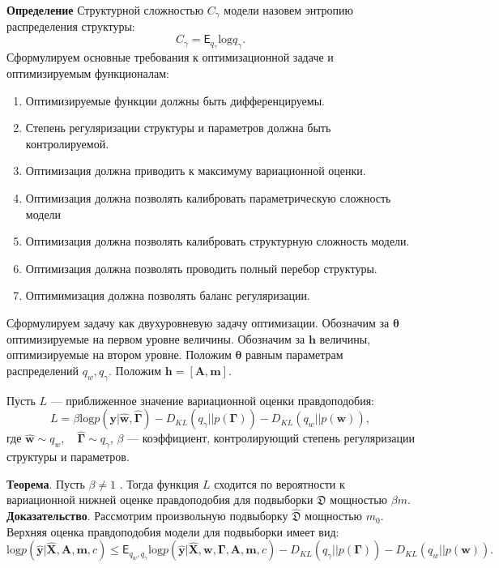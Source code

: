 \documentclass[12pt]{article}
\begin{document}
\textbf{Определение} Структурной сложностью $C_\gamma$ модели назовем энтропию распределения структуры:
\[
    C_\gamma = \mathsf{E}_{q_\gamma} \text{log}q_\gamma.
\]
Сформулируем основные требования к оптимизационной задаче и оптимизируемым функционалам:
\begin{enumerate}
\item Оптимизируемые функции должны быть дифференцируемы.
\item Степень регуляризации структуры и параметров должна быть контролируемой.
\item Оптимизация должна приводить к максимуму вариационной оценки.
\item Оптимизация должна позволять калибровать параметрическую сложность модели
\item Оптимизация должна позволять калибровать структурную сложность модели.
\item Оптимизация должна позволять проводить полный перебор структуры.
\item Оптимимизация должна позволять баланс регуляризации.
\end{enumerate}

Сформулируем задачу как двухуровневую задачу оптимизации. Обозначим за  $\boldsymbol{\theta}$ оптимизируемые на первом уровне величины. Обозначим за $\mathbf{h}$ величины, оптимизируемые на втором уровне.
Положим $\boldsymbol{\theta}$ равным параметрам распределений $q_w, q_\gamma$. 
Положим $\mathbf{h} = [\mathbf{A}, \mathbf{m}].$

Пусть $L$ --- приближенное значение вариационной оценки правдоподобия:
\[
    L = \beta\text{log} p(\mathbf{y}|\hat{\mathbf{w}}, \hat{\boldsymbol{\Gamma}}) - {D_{KL}}(q_\gamma||p(\boldsymbol{\Gamma})) - {D_{KL}}(q_{w}||p(\mathbf{w})),
\]
где $\hat{\mathbf{w}} \sim q_w, \quad \hat{\boldsymbol{\Gamma}} \sim q_\gamma$, $\beta$ --- коэффициент, контролирующий степень регуляризации структуры и параметров.


\textbf{Теорема}. Пусть $\beta \neq 1$ .
Тогда функция $L$ сходится по вероятности к вариационной нижней оценке правдоподобия для подвыборки  $\mathfrak{D}$ 
мощностью $\beta m$.\\
\textbf{Доказательство}. Рассмотрим произвольную подвыборку $\hat{\mathfrak{D}}$ мощностью $m_0$. Верхняя оценка правдоподобия модели для подвыборки имеет вид:
\[
 \text{log} p(\hat{\mathbf{y}}|\hat{\mathbf{X}},\mathbf{A},\mathbf{m}, c)  \leq \mathsf{E}_{q_w,q_\gamma}\text{log} p(\hat{\mathbf{y}}|\hat{\mathbf{X}},\mathbf{w}, \boldsymbol{\Gamma}, \mathbf{A},\mathbf{m}, c) - {D_{KL}}(q_\gamma||p(\boldsymbol{\Gamma})) - {D_{KL}}(q_{w}||p(\mathbf{w})).
\]
\end{document}

